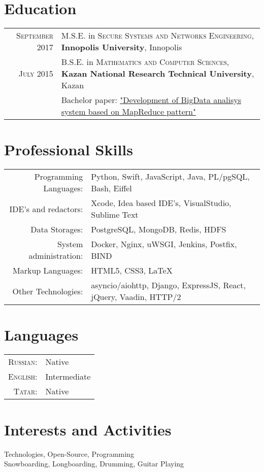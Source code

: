 \documentclass[a4paper,10pt]{article}
\begin{document}
\section{Education}
\begin{tabular}{r p{11cm}}	
 \textsc{September} 2017 & M.S.E. in \textsc{Secure Systems and Networks Engineering}, \textbf{Innopolis University}, Innopolis\\
 \textsc{July} 2015 & B.S.E. in \textsc{Mathematics and Computer Sciences}, \textbf{Kazan National Research Technical University}, Kazan\\
& Bachelor paper: \href{https://github.com/litleleprikon/bachelor\_paper}{"Development of BigData analisys system based on MapReduce pattern"}\\
\end{tabular}

\section{Professional Skills}
\begin{tabular}{r p{11cm}}

 Programming Languages:& Python, Swift, JavaScript, Java, PL/pgSQL, Bash, Eiffel \\
 IDE's and redactors:& Xcode, Idea based IDE's, VisualStudio, Sublime Text\\
 Data Storages:& PostgreSQL, MongoDB, Redis, HDFS \\
 System administration:& Docker, Nginx, uWSGI, Jenkins, Postfix, BIND\\
 Markup Languages:& HTML5, CSS3, \LaTeX \\
 Other Technologies:& asyncio/aiohttp, Django, ExpressJS, React, jQuery, Vaadin, HTTP/2
 
\end{tabular}

\section{Languages}
\begin{tabular}{r p{11cm}}
 \textsc{Russian:}&Native\\
\textsc{English:}&Intermediate\\
\textsc{Tatar:}&Native\\
\end{tabular}

\section{Interests and Activities}
Technologies, Open-Source, Programming\\
Snowboarding, Longboarding, Drumming, Guitar Playing
\end{document}
